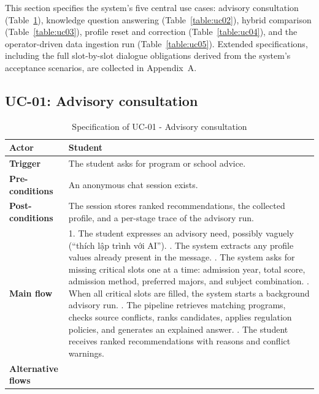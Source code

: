 \documentclass[../main.tex]{subfiles}
\begin{document}
This section specifies the system's five central use cases: advisory consultation (Table~\ref{table:uc01}), knowledge question answering (Table~\ref{table:uc02}), hybrid comparison (Table~\ref{table:uc03}), profile reset and correction (Table~\ref{table:uc04}), and the operator-driven data ingestion run (Table~\ref{table:uc05}).
Extended specifications, including the full slot-by-slot dialogue obligations derived from the system's acceptance scenarios, are collected in Appendix~A.

\subsection{UC-01: Advisory consultation}

\begin{table}[H]
    \centering
    \caption{Specification of UC-01 - Advisory consultation}
    \label{table:uc01}
    \begin{tabular}{|p{3.2cm}|p{10.3cm}|}
        \hline
        \textbf{Actor} & Student \\
        \hline
        \textbf{Trigger} & The student asks for program or school advice. \\
        \hline
        \textbf{Pre-conditions} & An anonymous chat session exists. \\
        \hline
        \textbf{Post-conditions} & The session stores ranked recommendations, the collected profile, and a per-stage trace of the advisory run. \\
        \hline
        \textbf{Main flow} &
        1. The student expresses an advisory need, possibly vaguely (``thích lập trình với AI''). \newline
        2. The system extracts any profile values already present in the message. \newline
        3. The system asks for missing critical slots one at a time: admission year, total score, admission method, preferred majors, and subject combination. \newline
        4. When all critical slots are filled, the system starts a background advisory run. \newline
        5. The pipeline retrieves matching programs, checks source conflicts, ranks candidates, applies regulation policies, and generates an explained answer. \newline
        6. The student receives ranked recommendations with reasons and conflict warnings. \\
        \hline
        \textbf{Alternative flows} &

\end{tabular}
\end{table}
\end{document}
